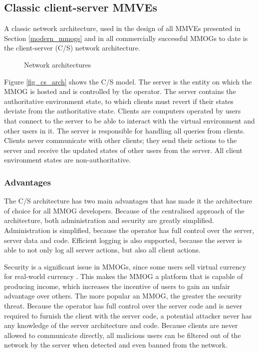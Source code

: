 \subsection{Classic client-server MMVEs}

A classic network architecture, used in the design of all MMVEs presented in Section \ref{modern_mmogs} and in all commercially successful MMOGs to date is the client-server (C/S) network architecture.

\begin{figure}[htbp]
\centering
\caption{Network architectures}
\end{figure}

Figure \ref{fig_cs_arch} shows the C/S model. The server is the entity on which the MMOG is hosted and is controlled by the operator. The server contains the authoritative environment state, to which clients must revert if their states deviate from the authoritative state. Clients are computers operated by users that connect to the server to be able to interact with the virtual environment and other users in it. The server is responsible for handling all queries from clients. Clients never communicate with other clients; they send their actions to the server and receive the updated states of other users from the server. All client environment states are non-authoritative.

\subsubsection{Advantages}

The C/S architecture has two main advantages that has made it the architecture of choice for all MMOG developers. Because of the centralised approach of the architecture, both administration and security are greatly simplified. Administration is simplified, because the operator has full control over the server, server data and code. Efficient logging is also supported, because the server is able to not only log all server actions, but also all client actions.

Security is a significant issue in MMOGs, since some users sell virtual currency for real-world currency \cite{chinese_gold_farmer}. This makes the MMOG a platform that is capable of producing income, which increases the incentive of users to gain an unfair advantage over others. The more popular an MMOG, the greater the security threat. Because the operator has full control over the server code and is never required to furnish the
client with the server code, a potential attacker never has any knowledge of the server architecture and code. Because clients are never allowed to communicate directly, all malicious users can be filtered out of the network by the server when detected and even banned from the network.

